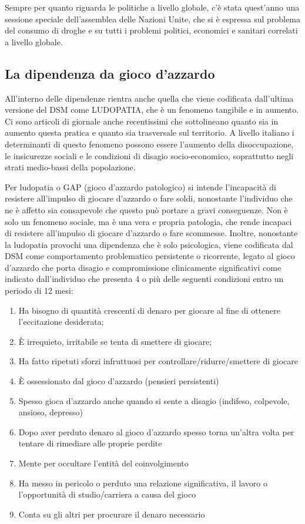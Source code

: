 Sempre per quanto riguarda le politiche a livello globale, c'è stata
quest'anno una sessione speciale dell'assemblea delle Nazioni Unite, che
si è espressa sul problema del consumo di droghe e su tutti i problemi
politici, economici e sanitari correlati a livello globale.

\subsection{La dipendenza da gioco d'azzardo}


All'interno delle dipendenze rientra anche quella che viene codificata
dall'ultima versione del DSM come LUDOPATIA, che è un fenomeno tangibile
e in aumento. Ci sono articoli di giornale anche recentissimi che
sottolineano quanto sia in aumento questa pratica e quanto sia
trasversale sul territorio. A livello italiano i determinanti di questo
fenomeno possono essere l'aumento della disoccupazione, le insicurezze
sociali e le condizioni di disagio socio-economico, soprattutto negli
strati medio-bassi della popolazione.

Per ludopatia o GAP (gioco d'azzardo patologico) si intende l'incapacità
di resistere all'impulso di giocare d'azzardo o fare soldi, nonostante
l'individuo che ne è affetto sia consapevole che questo può portare a
gravi conseguenze. Non è solo un fenomeno sociale, ma è una vera e
propria patologia, che rende incapaci di resistere all'impulso di
giocare d'azzardo o fare scommesse. Inoltre, nonostante la ludopatia
provochi una dipendenza che è solo psicologica, viene codificata dal DSM
come comportamento problematico persistente o ricorrente, legato al
gioco d'azzardo che porta disagio e compromissione clinicamente
significativi come indicato dall'individuo che presenta 4 o più delle
seguenti condizioni entro un periodo di 12 mesi:

\begin{enumerate}
\def\labelenumi{\arabic{enumi}.}
\item
  Ha bisogno di quantità crescenti di denaro per giocare al fine di
  ottenere l'eccitazione desiderata;
\item
  È irrequieto, irritabile se tenta di smettere di giocare;
\item
  Ha fatto ripetuti sforzi infruttuosi per controllare/ridurre/smettere
  di giocare
\item
  È ossessionato dal gioco d'azzardo (pensieri persistenti)
\item
  Spesso gioca d'azzardo anche quando si sente a disagio (indifeso,
  colpevole, ansioso, depresso)
\item
  Dopo aver perduto denaro al gioco d'azzardo spesso torna un'altra
  volta per tentare di rimediare alle proprie perdite
\item
  Mente per occultare l'entità del coinvolgimento
\item
  Ha messo in pericolo o perduto una relazione significativa, il lavoro
  o l'opportunità di studio/carriera a causa del gioco
\item
  Conta su gli altri per procurare il denaro necessario
\end{enumerate}

